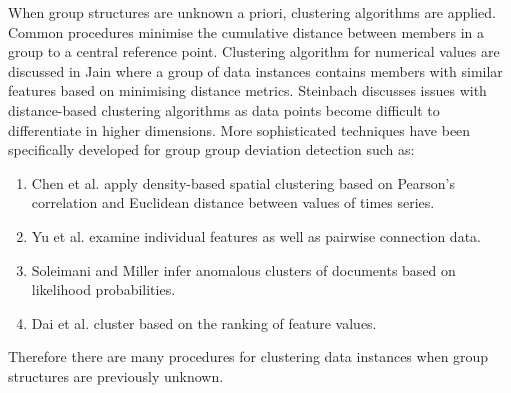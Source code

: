 When group structures are unknown a priori,  clustering algorithms are applied. Common procedures minimise the cumulative  distance  between  members in a group to a central reference point. %
 Clustering algorithm  for numerical values  are discussed in Jain \cite{jain2010} where a group of data instances contains members with similar features based on minimising distance metrics.   
Steinbach \cite{steinbach2004} discusses issues with distance-based clustering algorithms as data points become difficult to differentiate in higher dimensions.   More sophisticated techniques have been specifically developed for group  
 group deviation detection   %
 such as:
\begin{enumerate}[-]
\item Chen et al.  \cite{GLETS}  apply density-based spatial clustering based on Pearson's correlation and Euclidean distance between values of times series. 
\item    Yu et al. \cite{GLAD} examine individual features as well as pairwise connection data.  %
\item Soleimani and   Miller \cite{ATD} infer anomalous clusters of documents based on likelihood probabilities.
\item Dai et al. \cite{ERACD} cluster based on the ranking of feature values. 
\end{enumerate}
Therefore there are many procedures for clustering data instances when group structures are previously unknown.


